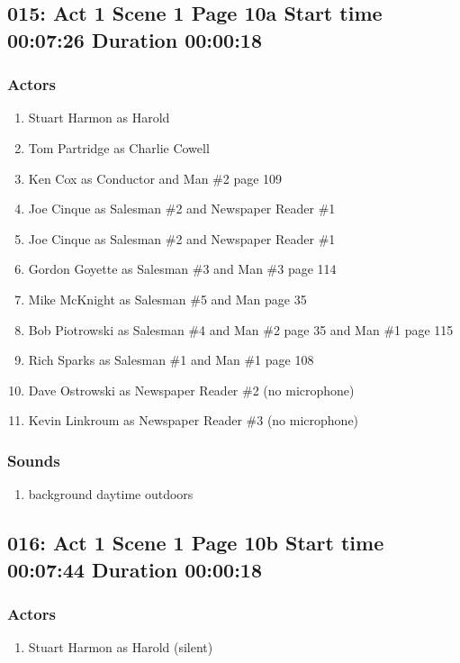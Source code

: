 \subsection{015: Act 1 Scene 1 Page 10a Start time 00:07:26 Duration 00:00:18}

\subsubsection{Actors}
\begin{enumerate}
\item Stuart Harmon as Harold
\item Tom Partridge as Charlie Cowell
\item Ken Cox as Conductor and Man \#2 page 109
\item Joe Cinque as Salesman \#2 and Newspaper Reader \#1
\item Joe Cinque as Salesman \#2 and Newspaper Reader \#1
\item Gordon Goyette as Salesman \#3 and Man \#3 page 114
\item Mike McKnight as Salesman \#5 and Man page 35
\item Bob Piotrowski as Salesman \#4 and Man \#2 page 35 and Man \#1 page 115
\item Rich Sparks as Salesman \#1 and Man \#1 page 108
\item Dave Ostrowski as Newspaper Reader \#2 (no microphone)
\item Kevin Linkroum as Newspaper Reader \#3 (no microphone)
\end{enumerate}

\subsubsection{Sounds}
\begin{enumerate}
\item background daytime outdoors
\end{enumerate}
\subsection{016: Act 1 Scene 1 Page 10b Start time 00:07:44 Duration 00:00:18}

\subsubsection{Actors}
\begin{enumerate}
\item Stuart Harmon as Harold (silent)
\end{enumerate}

